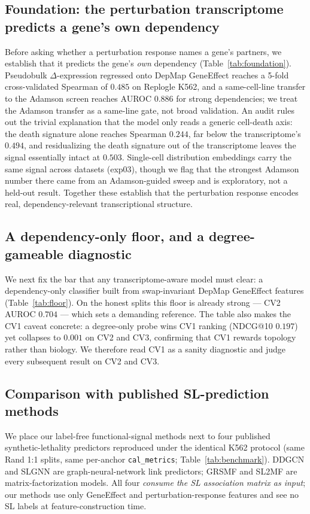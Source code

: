 \subsection{Foundation: the perturbation transcriptome predicts a gene's own dependency}
\label{sec:exp-foundation}

Before asking whether a perturbation response names a gene's partners, we
establish that it predicts the gene's \emph{own} dependency
(Table~\ref{tab:foundation}). Pseudobulk $\Delta$-expression regressed onto DepMap
GeneEffect reaches a 5-fold cross-validated Spearman of $0.485$ on Replogle K562,
and a same-cell-line transfer to the Adamson screen reaches AUROC $0.886$ for
strong dependencies; we treat the Adamson transfer as a same-line gate, not broad
validation. An audit rules out the trivial explanation that the model only reads
a generic cell-death axis: the death signature alone reaches Spearman $0.244$,
far below the transcriptome's $0.494$, and residualizing the death signature out
of the transcriptome leaves the signal essentially intact at $0.503$. Single-cell
distribution embeddings carry the same signal across datasets (exp03), though we
flag that the strongest Adamson number there came from an Adamson-guided sweep and
is exploratory, not a held-out result. Together these establish that the
perturbation response encodes real, dependency-relevant transcriptional structure.



\subsection{A dependency-only floor, and a degree-gameable diagnostic}
\label{sec:exp-floor}

We next fix the bar that any transcriptome-aware model must clear:
a dependency-only classifier built from swap-invariant DepMap GeneEffect features
(Table~\ref{tab:floor}). On the honest splits this floor is already strong ---
CV2 AUROC $0.704$ --- which sets a demanding reference. The table also makes the
CV1 caveat concrete: a degree-only probe wins CV1 ranking (NDCG@10 $0.197$) yet
collapses to $0.001$ on CV2 and CV3, confirming that CV1 rewards topology rather
than biology. We therefore read CV1 as a sanity diagnostic and judge every
subsequent result on CV2 and CV3.



\FloatBarrier

\subsection{Comparison with published SL-prediction methods}
\label{sec:benchmark}
We place our label-free functional-signal methods next to four published
synthetic-lethality predictors reproduced under the identical K562 protocol
(same Rand 1:1 splits, same per-anchor \texttt{cal\_metrics};
Table~\ref{tab:benchmark}). DDGCN and SLGNN are graph-neural-network link
predictors; GRSMF and SL2MF are matrix-factorization models. All four
\emph{consume the SL association matrix as input}; our methods use only
GeneEffect and perturbation-response features and see no SL labels at
feature-construction time.

